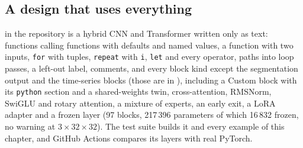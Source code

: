 \subsection{A design that uses everything}
 in the repository is a hybrid CNN and Transformer written only as text: functions calling functions
with defaults and named values, a function with two inputs, \texttt{for} with tuples, \texttt{repeat} with \texttt{i}, \texttt{let} and
every operator, paths into loop passes, a left-out label, comments, and every block kind except the segmentation output and the time-series blocks (those are in
), including a Custom block with its \texttt{python} section and a shared-weights twin, cross-attention, RMSNorm, SwiGLU and rotary attention, a mixture of experts, an early exit, a LoRA adapter and a frozen
layer (97 blocks, 217\,396 parameters of which 16\,832 frozen, no warning at $3\times32\times32$). The test suite builds it and every example of this chapter, and GitHub Actions
compares its layers with real PyTorch.

